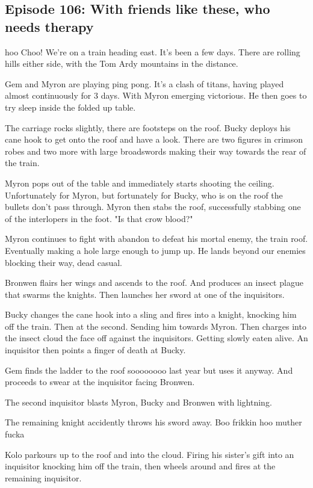 \subsection{Episode 106: With friends like these, who needs therapy}

hoo Choo! We're on a train heading east. It's been a few days. There are rolling hills either side, with the Tom Ardy mountains in the distance.\medskip

Gem and Myron are playing ping pong. It's a clash of titans, having played almost continuously for 3 days. With Myron emerging victorious. He then goes to try sleep inside the folded up table.\medskip

The carriage rocks slightly, there are footsteps on the roof. Bucky deploys his cane hook to get onto the roof and have a look. There are two figures in crimson robes and two more with large broadswords making their way towards the rear of the train.\medskip

Myron pops out of the table and immediately starts shooting the ceiling. Unfortunately for Myron, but fortunately for Bucky, who is on the roof the bullets don't pass through. Myron then stabs the roof, successfully stabbing one of the interlopers in the foot. "Is that crow blood?"\medskip

Myron continues to fight with abandon to defeat his mortal enemy, the train roof. Eventually making a hole large enough to jump up. He lands beyond our enemies blocking their way, dead casual.\medskip

Bronwen flairs her wings and ascends to the roof. And produces an insect plague that swarms the knights. Then launches her sword at one of the inquisitors.\medskip

Bucky changes the cane hook into a sling and fires into a knight, knocking him off the train. Then at the second. Sending him towards Myron. Then charges into the insect cloud the face off against the inquisitors. Getting slowly eaten alive. An inquisitor then points a finger of death at Bucky.\medskip

Gem finds the ladder to the roof soooooooo last year but uses it anyway. And proceeds to swear at the inquisitor facing Bronwen.\medskip

The second inquisitor blasts Myron, Bucky and Bronwen with lightning.\medskip

The remaining knight accidently throws his sword away. Boo frikkin hoo muther fucka\medskip

Kolo parkours up to the roof and into the cloud. Firing his sister's gift into an inquisitor knocking him off the train, then wheels around and fires at the remaining inquisitor.\medskip

